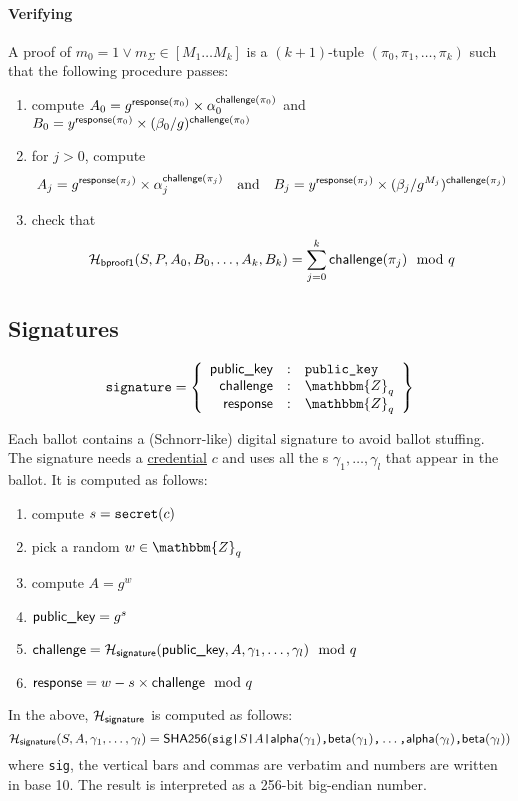 \documentclass[a4paper]{article}
\newcommand{\Z}{\mathbbm{Z}}
\newcommand{\shatwo}{\textsf{SHA256}}
\begin{document}
\paragraph{Verifying \oproof}
A proof of $m_0=1\lor m_\Sigma\in[M_1\dots M_k]$ is a $(k+1)$-tuple
$(\pi_0,\pi_1,\dotsc,\pi_k)$ such that the following procedure passes:
\begin{enumerate}
\item compute
  $A_0=g^{\textsf{response}(\pi_0)}\times\alpha_0^{\textsf{challenge}(\pi_0)}$
  and
  $B_0=y^{\textsf{response}(\pi_0)}\times(\beta_0/g)^{\textsf{challenge}(\pi_0)}$
\item for $j>0$, compute
  \[A_j=g^{\textsf{response}(\pi_j)}\times\alpha_j^{\textsf{challenge}(\pi_j)}
  \quad\text{and}\quad
  B_j=y^{\textsf{response}(\pi_j)}\times(\beta_j/g^{M_j})^{\textsf{challenge}(\pi_j)}\]
\item check that
  \[\mathcal{H}_{\textsf{bproof1}}(S,P,A_0,B_0,\dots,A_k,B_k)=\sum_{j=0}^k\textsf{challenge}(\pi_j)\mod q\]
\end{enumerate}

\subsection{Signatures}
\label{signatures}

\begin{gather*}
  \signature=\left\{
    \begin{array}{rcl}
      \pklabel&:&\pk\\
      \challenge&:&\Z_q\\
      \response&:&\Z_q
    \end{array}
  \right\}
\end{gather*}

\newcommand{\siglabel}{\textsf{signature}}

Each ballot contains a (Schnorr-like) digital signature to avoid
ballot stuffing. The signature needs a
\hyperref[credentials]{credential} $c$ and uses all the \ciphertext{}s
$\gamma_1,\dots,\gamma_l$ that appear in the ballot. It is computed as
follows:
\begin{enumerate}
\item compute $s=\texttt{secret}(c)$
\item pick a random $w\in\Z_q$
\item compute $A=g^w$
\item $\textsf{public\_key}=g^s$
\item $\challenge=\Hash_\siglabel(\pklabel,A,\gamma_1,\dots,\gamma_l)\mod q$
\item $\textsf{response}=w-s\times\textsf{challenge}\mod q$
\end{enumerate}
In the above, $\Hash_\siglabel$ is computed as follows:
\[
\Hash_\siglabel(S,A,\gamma_1,\dots,\gamma_l)=\shatwo(\verb=sig|=S\verb=|=A\verb=|=\alphalabel(\gamma_1)\verb=,=\betalabel(\gamma_1)\verb=,=\dots\verb=,=\alphalabel(\gamma_l)\verb=,=\betalabel(\gamma_l))
\]
where \verb=sig=, the vertical bars and commas are verbatim and
numbers are written in base 10. The result is interpreted as a 256-bit
big-endian number.
\end{document}
